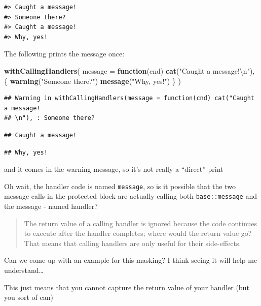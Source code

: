 \documentclass[]{book}
\newenvironment{Shaded}{\begin{snugshade}}{\end{snugshade}}
\newcommand{\CharTok}[1]{\textcolor[rgb]{0.31,0.60,0.02}{#1}}
\newcommand{\ControlFlowTok}[1]{\textcolor[rgb]{0.13,0.29,0.53}{\textbf{#1}}}
\newcommand{\DataTypeTok}[1]{\textcolor[rgb]{0.13,0.29,0.53}{#1}}
\newcommand{\KeywordTok}[1]{\textcolor[rgb]{0.13,0.29,0.53}{\textbf{#1}}}
\newcommand{\NormalTok}[1]{#1}
\newcommand{\StringTok}[1]{\textcolor[rgb]{0.31,0.60,0.02}{#1}}
\begin{document}
\begin{verbatim}
#> Caught a message!
#> Someone there?
#> Caught a message!
#> Why, yes!
\end{verbatim}

The following prints the message once:

\begin{Shaded}
\begin{Highlighting}[]
\KeywordTok{withCallingHandlers}\NormalTok{(}
  \DataTypeTok{message =} \ControlFlowTok{function}\NormalTok{(cnd) }\KeywordTok{cat}\NormalTok{(}\StringTok{"Caught a message!}\CharTok{\textbackslash{}n}\StringTok{"}\NormalTok{), }
\NormalTok{  \{}
    \KeywordTok{warning}\NormalTok{(}\StringTok{"Someone there?"}\NormalTok{)}
    \KeywordTok{message}\NormalTok{(}\StringTok{"Why, yes!"}\NormalTok{)}
\NormalTok{  \}}
\NormalTok{)}
\end{Highlighting}
\end{Shaded}

\begin{verbatim}
## Warning in withCallingHandlers(message = function(cnd) cat("Caught a message!
## \n"), : Someone there?
\end{verbatim}

\begin{verbatim}
## Caught a message!
\end{verbatim}

\begin{verbatim}
## Why, yes!
\end{verbatim}

and it comes in the warning message, so it's not really a ``direct'' print

Oh wait, the handler code is named \texttt{message}, so is it possible that the two message calls in the protected block are actually calling both \texttt{base::message} and the message - named handler?

\begin{quote}
The return value of a calling handler is ignored because the code continues to execute after the handler completes; where would the return value go? That means that calling handlers are only useful for their side-effects.
\end{quote}

Can we come up with an example for this masking? I think seeing it will help me understand\ldots{}

This just means that you cannot capture the return value of your handler (but you sort of can)
\end{document}
